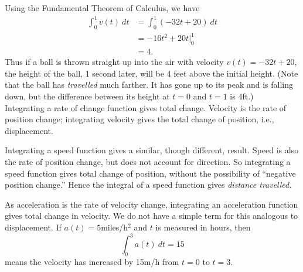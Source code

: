 {Using the Fundamental Theorem of Calculus, we have 
\begin{align*}
\int_0^1 v(t)\ dt &= \int_0^1 (-32t+20)\ dt \\
			&= -16t^2 + 20t\Big|_0^1 \\
			&= 4.
\end{align*}
Thus if a ball is thrown straight up into the air with velocity $v(t) = -32t+20$, the height of the ball, 1 second later, will be 4 feet above the initial height. (Note that the ball has \textit{travelled} much farther. It has gone up to its peak and is falling down, but the difference between its height at $t=0$ and $t=1$ is 4ft.)
}\\

Integrating a rate of change function gives total change. Velocity is the rate of position change; integrating velocity gives the total change of position, i.e., displacement.

Integrating a speed function gives a similar, though different, result. Speed is also the rate of position change, but does not account for direction. So integrating a speed function gives total change of position, without the possibility of ``negative position change.'' Hence the integral of a speed function gives \textit{distance travelled.}


As acceleration is the rate of velocity change, integrating an acceleration function gives total change in velocity. We do not have a simple term for this analogous to displacement. If $a(t) = 5$miles/h$^2$ and $t$ is measured in hours, then 
\[
\int_0^3 a(t)\ dt = 15
\]
means the velocity has increased by 15m/h from $t=0$ to $t=3$.
\\

